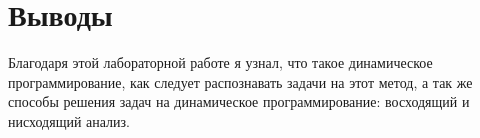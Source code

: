 \section{Выводы}

Благодаря этой лабораторной работе я узнал, что такое динамическое программирование, как следует распознавать задачи на этот метод, а так же способы решения задач на динамическое программирование: восходящий и нисходящий анализ.

\pagebreak
